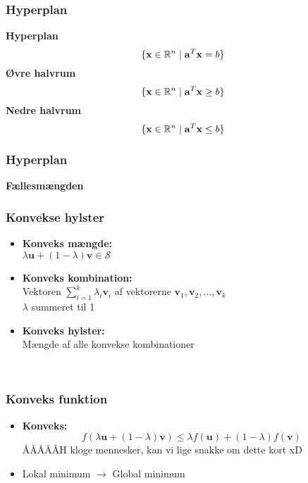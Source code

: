 \begin{frame}
\frametitle{Hyperplan}
\textbf{Hyperplan}
$$\{\textbf{x} \in \mathbb{R}^n \mid \mathbf{a}^T \mathbf{x}=b\}$$ 
%
\textbf{Øvre halvrum}
$$\{\textbf{x} \in \mathbb{R}^n \mid \mathbf{a}^T \mathbf{x} \geq b\}$$ 
\textbf{Nedre halvrum}
$$\{\textbf{x} \in \mathbb{R}^n \mid \mathbf{a}^T \mathbf{x} \leq b\}$$ 
\end{frame}

\begin{frame}
\frametitle{Hyperplan}
\textbf{Fællesmængden}

\end{frame}


\begin{frame}
\frametitle{Konvekse hylster }
\begin{itemize}
\item \textbf{Konveks mængde: } \\
$\lambda \textbf{u} + (1- \lambda ) \textbf{v} \in \mathcal{S}$
\item \textbf{Konveks kombination: } \\ 
Vektoren $\sum_{i=1}^{k} \lambda_i \textbf{v}_i$ af vektorerne $\textbf{v}_1, \textbf{v}_2, \ldots, \textbf{v}_k$ 
\\ $\lambda$ summeret til 1
\item \textbf{Konveks hylster: } \\
Mængde af alle konvekse kombinationer \\
\end{itemize}
\phantom{H} \\

\end{frame}

\begin{frame}
\frametitle{Konveks funktion}
\begin{itemize}
	\item \textbf{Konveks:} 
	$$f(\lambda \textbf{u} + (1- \lambda ) \textbf{v}) \leq \lambda f( \textbf{u}) + (1- \lambda ) f(\textbf{v}) $$ 
	ÅÅÅÅÅH kloge mennesker, kan vi lige snakke om dette kort xD 
\end{itemize}

\begin{itemize}
\item Lokal minimum $\rightarrow$ Global minimum
\end{itemize}
\phantom{H} \\
\phantom{H} \\
\end{frame}



